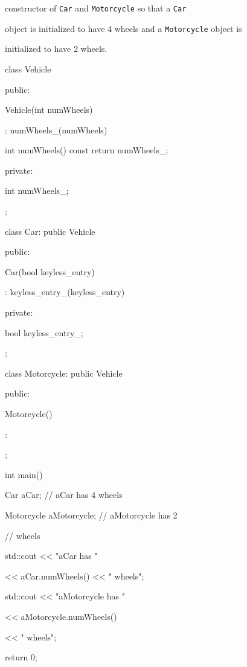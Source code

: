 constructor of \verb!Car! and \verb!Motorcycle! so that a \verb!Car!

object is initialized to have 4 wheels and a \verb!Motorcycle! object is

initialized to have 2 wheels.



\begin{console}

class Vehicle

{

public:

        Vehicle(int numWheels)

           : numWheels_(numWheels)

        {}

        int numWheels() const { return numWheels_; }

private:

        int numWheels_;

};



class Car: public Vehicle

{

public:

        Car(bool keyless_entry)

           : keyless_entry_(keyless_entry)

        {}

private:

        bool keyless_entry_;

};



class Motorcycle: public Vehicle

{

public:

        Motorcycle()

            :

        {}

};



int main()

{   

    Car aCar;               // aCar has 4 wheels

    Motorcycle aMotorcycle; // aMotorcycle has 2

                            // wheels

    std::cout << "aCar has "

              << aCar.numWheels() << " wheels\n";

    std::cout << "aMotorcycle has "

              << aMotorcycle.numWheels()

              << " wheels\n";

    return 0;

}

\end{console}

